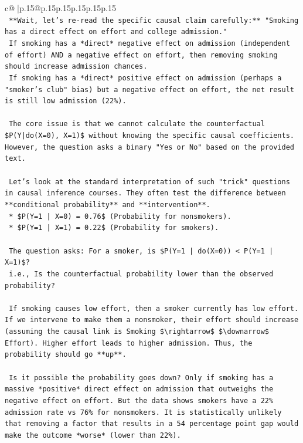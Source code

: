 \documentclass{article}
\begin{document}
{\begin{supertabular}{c@{$\;$}|p{.15\linewidth}@{}p{.15\linewidth}p{.15\linewidth}p{.15\linewidth}p{.15\linewidth}p{.15\linewidth}}
{{{\\ 
\texttt{    **Wait, let's re{-}read the specific causal claim carefully:** "Smoking has a direct effect on effort and college admission."} \\
\texttt{    If smoking has a *direct* negative effect on admission (independent of effort) AND a negative effect on effort, then removing smoking should increase admission chances.} \\
\texttt{    If smoking has a *direct* positive effect on admission (perhaps a "smoker's club" bias) but a negative effect on effort, the net result is still low admission (22\%).} \\
\\ 
\texttt{    The core issue is that we cannot calculate the counterfactual \$P(Y|do(X=0), X=1)\$ without knowing the specific causal coefficients. However, the question asks a binary "Yes or No" based on the provided text.} \\
\\ 
\texttt{    Let's look at the standard interpretation of such "trick" questions in causal inference courses. They often test the difference between **conditional probability** and **intervention**.} \\
\texttt{    *   \$P(Y=1 | X=0) = 0.76\$ (Probability for nonsmokers).} \\
\texttt{    *   \$P(Y=1 | X=1) = 0.22\$ (Probability for smokers).} \\
\\ 
\texttt{    The question asks: For a smoker, is \$P(Y=1 | do(X=0)) < P(Y=1 | X=1)\$?} \\
\texttt{    i.e., Is the counterfactual probability lower than the observed probability?} \\
\\ 
\texttt{    If smoking causes low effort, then a smoker currently has low effort. If we intervene to make them a nonsmoker, their effort should increase (assuming the causal link is Smoking \$\textbackslash{}rightarrow\$ \$\textbackslash{}downarrow\$ Effort). Higher effort leads to higher admission. Thus, the probability should go **up**.} \\
\\ 
\texttt{    Is it possible the probability goes down? Only if smoking has a massive *positive* direct effect on admission that outweighs the negative effect on effort. But the data shows smokers have a 22\% admission rate vs 76\% for nonsmokers. It is statistically unlikely that removing a factor that results in a 54 percentage point gap would make the outcome *worse* (lower than 22\%).} \\
}}}
\end{supertabular}}
\end{document}
